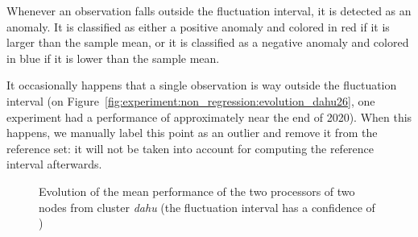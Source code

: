                 Whenever an observation falls outside the fluctuation interval, it is detected as an anomaly. It is
                classified as either a positive anomaly and colored in red if it is larger than the sample mean, or it
                is classified as a negative anomaly and colored in blue if it is lower than the sample mean.

                It occasionally happens that a single observation is way outside the fluctuation interval (\eg on
                Figure~\ref{fig:experiment:non_regression:evolution_dahu26}, one experiment had a performance of
                approximately  near the end of 2020). When this happens, we manually label
                this point as an outlier and remove it from the reference set: it will not be taken into account for
                computing the reference interval afterwards.

                \begin{figure}[htpb]
                    \centering
                    \caption{Evolution of the mean performance of the two processors of two nodes from cluster \emph{dahu}
                    (the fluctuation interval has a confidence of )}%
                    \label{fig:experiment:non_regression:evolution_dahu}
                \end{figure}

